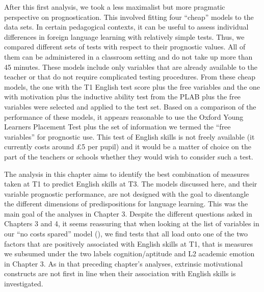 \documentclass[output=paper]{langsci/langscibook}
\begin{document}
After this first analysis, we took a less maximalist but more pragmatic perspective on prognostication. This involved fitting four ``cheap'' models to the data sets. In certain pedagogical contexts, it can be useful to assess individual differences in foreign language learning with relatively simple tests. Thus, we compared different sets of tests with respect to their prognostic values. All of them can be administered in a classroom setting and do not take up more than 45 minutes. These models include only variables that are already available to the teacher or that do not require complicated testing procedures. From these cheap models, the one with the T1 English test score plus the free variables and the one with motivation plus the inductive ability test from the PLAB plus the free variables were selected and applied to the test set. Based on a comparison of the performance of these models, it appears reasonable to use the Oxford Young Learners Placement Test plus the set of information we termed the ``free variables'' for prognostic use. This test of English skills is not freely available (it currently costs around £5 per pupil) and it would be a matter of choice on the part of the teachers or schools whether they would wish to consider such a test. 

The analysis in this chapter aims to identify the best combination of measures taken at T1 to predict English skills at T3. The models discussed here, and their variable prognostic performance, are not designed with the goal to disentangle the different dimensions of predispositions for language learning. This was the main goal of the analyses in Chapter 3. Despite the different questions asked in Chapters 3 and 4, it seems reassuring that when looking at the list of variables in our ``no costs spared'' model (), we find tests that all load onto one of the two factors that are positively associated with English skills at T1, that is measures we subsumed under the two labels cognition/aptitude and L2 academic emotion in Chapter 3. As in that preceding chapter’s analyses, extrinsic motivational constructs are not first in line when their association with English skills is investigated. 

{\sloppy\printbibliography[heading=subbibliography,notkeyword=this]}
\end{document}
